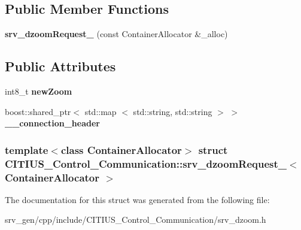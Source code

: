 \subsection*{\-Public \-Member \-Functions}
\begin{DoxyCompactItemize}
\item 
\hypertarget{struct_c_i_t_i_u_s___control___communication_1_1srv__dzoom_request___aacca14aa932f8d1404b6e0c704eebbd8}{{\bfseries srv\-\_\-dzoom\-Request\-\_\-} (const \-Container\-Allocator \&\-\_\-alloc)}\label{struct_c_i_t_i_u_s___control___communication_1_1srv__dzoom_request___aacca14aa932f8d1404b6e0c704eebbd8}

\end{DoxyCompactItemize}
\subsection*{\-Public \-Attributes}
\begin{DoxyCompactItemize}
\item 
\hypertarget{struct_c_i_t_i_u_s___control___communication_1_1srv__dzoom_request___a11cc7fbb5c3c45eafb635f04ec6da4be}{int8\-\_\-t {\bfseries new\-Zoom}}\label{struct_c_i_t_i_u_s___control___communication_1_1srv__dzoom_request___a11cc7fbb5c3c45eafb635f04ec6da4be}

\item 
\hypertarget{struct_c_i_t_i_u_s___control___communication_1_1srv__dzoom_request___a3fc141f98b2c9a378e7eb7f9983ed985}{boost\-::shared\-\_\-ptr$<$ std\-::map\*
$<$ std\-::string, std\-::string $>$ $>$ {\bfseries \-\_\-\-\_\-connection\-\_\-header}}\label{struct_c_i_t_i_u_s___control___communication_1_1srv__dzoom_request___a3fc141f98b2c9a378e7eb7f9983ed985}

\end{DoxyCompactItemize}
\subsubsection*{template$<$class Container\-Allocator$>$ struct C\-I\-T\-I\-U\-S\-\_\-\-Control\-\_\-\-Communication\-::srv\-\_\-dzoom\-Request\-\_\-$<$ Container\-Allocator $>$}



\-The documentation for this struct was generated from the following file\-:\begin{DoxyCompactItemize}
\item 
srv\-\_\-gen/cpp/include/\-C\-I\-T\-I\-U\-S\-\_\-\-Control\-\_\-\-Communication/srv\-\_\-dzoom.\-h\end{DoxyCompactItemize}
